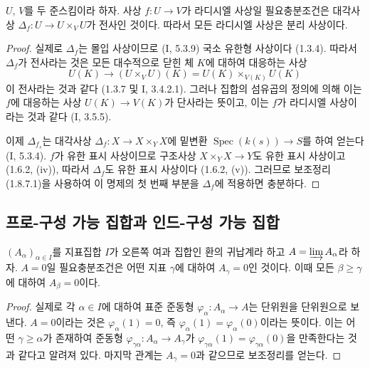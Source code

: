 \begin{lemma}[1.8.7.1]
\label{IV.1.8.7.1-fr}
$U$, $V$를 두 준스킴이라 하자. 사상 $f:U\to V$가 라디시엘
사상일 필요충분조건은 대각사상
$\Delta_f:U\to U\times_VU$가 전사인 것이다. 따라서 모든 라디시엘
사상은 분리 사상이다.
\end{lemma}

\begin{proof}
실제로 $\Delta_f$는 몰입 사상이므로 (I, 5.3.9) 국소 유한형 사상이다
(1.3.4). 따라서 $\Delta_f$가 전사라는 것은 모든 대수적으로 닫힌 체
$K$에 대하여 대응하는 사상
\[
  U(K)\longrightarrow (U\times_VU)(K)
  =U(K)\times_{V(K)}U(K)
\]
이 전사라는 것과 같다 (1.3.7 및 I, 3.4.2.1). 그러나 집합의
섬유곱의 정의에 의해 이는 $f$에 대응하는 사상 $U(K)\to V(K)$가
단사라는 뜻이고, 이는 $f$가 라디시엘 사상이라는 것과 같다
(I, 3.5.5).

이제 $\Delta_{f_s}$는 대각사상
$\Delta_f:X\to X\times_YX$에 밑변환
$\operatorname{Spec}(k(s))\to S$를 하여 얻는다 (I, 5.3.4). $f$가
유한 표시 사상이므로 구조사상 $X\times_YX\to Y$도 유한 표시
사상이고 (1.6.2, (iv)), 따라서 $\Delta_f$도 유한 표시 사상이다
(1.6.2, (v)). 그러므로 보조정리 (1.8.7.1)을 사용하여 이 명제의
첫 번째 부분을 $\Delta_f$에 적용하면 충분하다.
\end{proof}

\subsection{프로-구성 가능 집합과 인드-구성 가능 집합}
\label{subsection:IV.1.9-fr}

\begin{lemma}[1.9.1]
\label{IV.1.9.1-fr}
$(A_\alpha)_{\alpha\in I}$를 지표집합 $I$가 오른쪽 여과 집합인 환의
귀납계라 하고 $A=\varinjlim A_\alpha$라 하자. $A=0$일 필요충분조건은
어떤 지표 $\gamma$에 대하여 $A_\gamma=0$인 것이다. 이때 모든
$\beta\geq\gamma$에 대하여 $A_\beta=0$이다.
\end{lemma}

\begin{proof}
실제로 각 $\alpha\in I$에 대하여 표준 준동형
$\varphi_\alpha:A_\alpha\to A$는 단위원을 단위원으로 보낸다.
$A=0$이라는 것은 $\varphi_\alpha(1)=0$, 즉
$\varphi_\alpha(1)=\varphi_\alpha(0)$이라는 뜻이다. 이는 어떤
$\gamma\geq\alpha$가 존재하여 준동형
$\varphi_{\gamma\alpha}:A_\alpha\to A_\gamma$가
$\varphi_{\gamma\alpha}(1)=\varphi_{\gamma\alpha}(0)$을 만족한다는
것과 같다고 알려져 있다. 마지막 관계는 $A_\gamma=0$과 같으므로
보조정리를 얻는다.
\end{proof}

